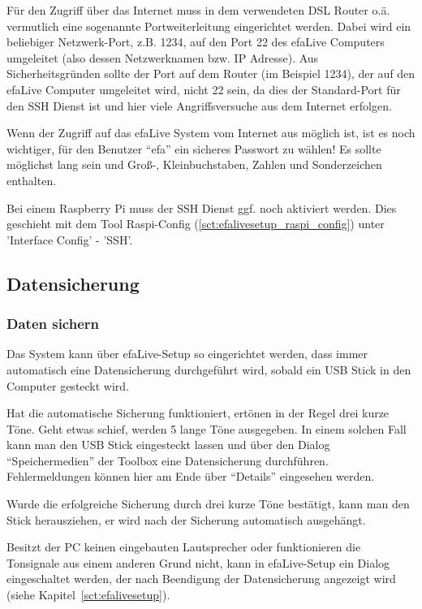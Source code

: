 \documentclass[a4paper,12pt,twoside]{article}
\begin{document}
Für den Zugriff über das Internet muss in dem verwendeten DSL Router
o.ä. vermutlich eine sogenannte Portweiterleitung eingerichtet werden.
Dabei wird ein beliebiger Netzwerk-Port, z.B. 1234, auf den Port 22 des
efaLive Computers umgeleitet (also dessen Netzwerknamen bzw. IP
Adresse). Aus Sicherheitsgründen sollte der Port auf dem Router (im
Beispiel 1234), der auf den efaLive Computer umgeleitet wird, nicht 22
sein, da dies der Standard-Port für den SSH Dienst ist und hier viele
Angriffsversuche aus dem Internet erfolgen.

Wenn der Zugriff auf das efaLive System vom Internet aus möglich ist,
ist es noch wichtiger, für den Benutzer
"`efa"' ein sicheres Passwort zu wählen! Es
sollte möglichst lang sein und Groß-, Kleinbuchstaben, Zahlen und
Sonderzeichen enthalten.

Bei einem Raspberry Pi muss der SSH Dienst ggf. noch aktiviert werden. 
Dies geschieht mit dem Tool Raspi-Config (\ref{sct:efalivesetup_raspi_config}) unter 
'Interface Config' - 'SSH'.

\subsection{Datensicherung}
\label{sct:datensicherung}
\subsubsection{Daten sichern}
\label{sct:daten_sichern}
Das System kann über efaLive-Setup
so eingerichtet werden, dass immer automatisch eine Datensicherung
durchgeführt wird, sobald ein USB Stick in den Computer gesteckt wird. 

Hat die automatische Sicherung funktioniert, ertönen in der Regel drei
kurze Töne. Geht etwas schief, werden 5 lange Töne ausgegeben. In einem
solchen Fall kann man den USB Stick eingesteckt lassen und über den
Dialog "`Speichermedien"' der Toolbox eine
Datensicherung durchführen. Fehlermeldungen können hier am Ende über
"`Details"' eingesehen werden.

Wurde die erfolgreiche Sicherung durch drei kurze Töne bestätigt, kann
man den Stick herausziehen, er wird nach der Sicherung automatisch
ausgehängt.

Besitzt der PC keinen eingebauten Lautsprecher oder funktionieren die
Tonsignale aus einem anderen Grund nicht, kann in efaLive-Setup ein
Dialog eingeschaltet werden, der nach Beendigung der Datensicherung
angezeigt wird (siehe Kapitel~\ref{sct:efalivesetup}).
\end{document}
